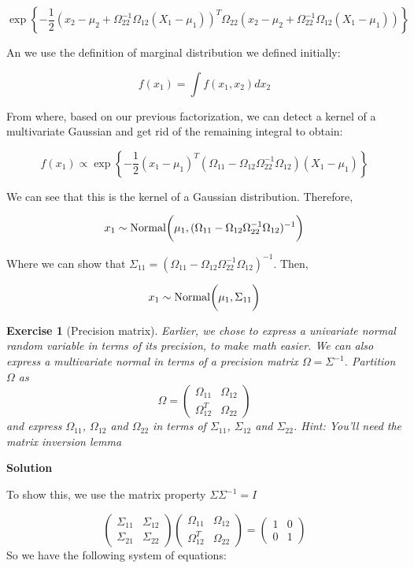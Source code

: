 \documentclass[twoside]{article}
\newcounter{lecnum}
\newtheorem{exercise}{Exercise}[lecnum]
\begin{document}
 $$
 \exp\left\{
  - \frac{1}{2}(x_2-\mu_2+ \Omega_{22}  ^{-1}\Omega_{12}(X_1-\mu_1) )^T \Omega_{22}   (x_2-\mu_2+\Omega_{22}  ^{-1}\Omega_{12}(X_1-\mu_1) )
  \right\} 
 $$

An we use the definition of marginal distribution we defined initially:

$$ f(x_1) =  \int f(x_1,x_2) dx_2 $$ 

From where, based on our previous factorization, we can detect a kernel of a multivariate Gaussian and get rid of the remaining integral to obtain:

$$ f(x_1) \propto  \exp\left\{
-\frac{1}{2}(x_1-\mu_1)^T
(\Omega_{11} - 
\Omega_{12}\Omega_{22}^{-1}\Omega_{12})
(X_1-\mu_1)
\right\} $$

We can see that this is the kernel of a Gaussian distribution. Therefore,

$$ x_1  \stackrel{\small{}}{\sim} \mbox{Normal} \bigg(\mu_1,(\Omega_{11} -\Omega_{12}\Omega_{22}^{-1}\Omega_{12})^{-1} \bigg) $$

Where we can show that $\Sigma_{11} = (\Omega_{11} -\Omega_{12}\Omega_{22}^{-1}\Omega_{12})^{-1} $. Then,

$$ x_1  \stackrel{\small{}}{\sim} \mbox{Normal} \bigg(\mu_1,\Sigma_{11}  \bigg) $$
\color{black}



\begin{exercise}[Precision matrix]
  Earlier, we chose to express a univariate normal random variable in terms of its precision, to make math easier. We can also express a multivariate normal in terms of a precision matrix $\Omega = \Sigma^{-1}$. Partition $\Omega$ as
  $$\Omega = \begin{pmatrix}\Omega_{11} & \Omega_{12} \\ \Omega_{12}^T & \Omega_{22}\end{pmatrix}$$
  and express $\Omega_{11}$, $\Omega_{12}$ and $\Omega_{22}$ in terms of $\Sigma_{11}$, $\Sigma_{12}$ and $\Sigma_{22}$. \textit{Hint: You'll need the matrix inversion lemma}
\end{exercise}

\color{blue}
\textbf{Solution}

To show this, we use the matrix property $\Sigma \Sigma^{-1} = I$

$$ \begin{pmatrix}\Sigma_{11} & \Sigma_{12} \\ \Sigma_{21} & \Sigma_{22}\end{pmatrix}  
\begin{pmatrix}\Omega_{11} & \Omega_{12} \\ \Omega_{12}^T & \Omega_{22}\end{pmatrix} =
\begin{pmatrix} 1 & 0 \\ 0 & 1 \end{pmatrix}
$$
So we have the following system of equations: 
\end{document}
